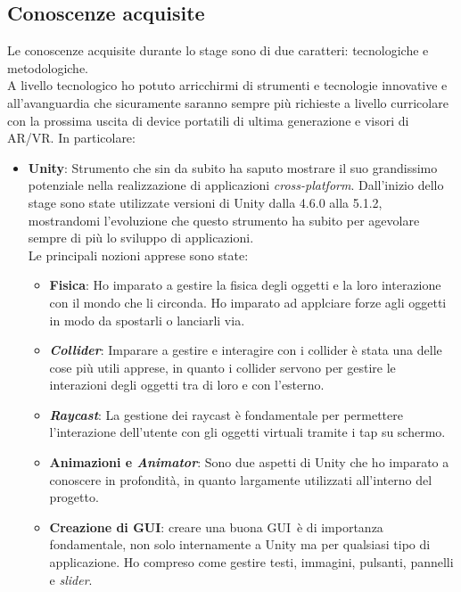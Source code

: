 \subsection{Conoscenze acquisite}
Le conoscenze acquisite durante lo stage sono di due caratteri: tecnologiche e metodologiche. \\
A livello tecnologico ho potuto arricchirmi di strumenti e tecnologie innovative e all'avanguardia che sicuramente saranno sempre pi\`u richieste a livello curricolare con la prossima uscita di device portatili di ultima generazione e visori di AR/VR. In particolare:

\begin{itemize}
	\item \textbf{Unity}: Strumento che sin da subito ha saputo mostrare il suo grandissimo potenziale nella realizzazione di applicazioni \textit{cross-platform\gloss}. Dall'inizio dello stage sono state utilizzate versioni di Unity dalla 4.6.0 alla 5.1.2, mostrandomi l'evoluzione che questo strumento ha subito per agevolare sempre di pi\`u lo sviluppo di applicazioni.\\
	Le principali nozioni apprese sono state:
	\begin{itemize}
		\item \textbf{Fisica}: Ho imparato a gestire la fisica degli oggetti e la loro interazione con il mondo che li circonda. Ho imparato ad applciare forze agli oggetti in modo da spostarli o lanciarli via.
		
		\item \textbf{\textit{Collider\gloss}}: Imparare a gestire e interagire con i collider \`e stata una delle cose pi\`u utili apprese, in quanto i collider servono per gestire le interazioni degli oggetti tra di loro e con l'esterno.
		
		\item \textbf{\textit{Raycast}}: La gestione dei raycast \`e fondamentale per permettere l'interazione dell'utente con gli oggetti virtuali tramite i tap su schermo.
		
		\item \textbf{Animazioni e \textit{Animator}}: Sono due aspetti di Unity che ho imparato a conoscere in profondit\`a, in quanto largamente utilizzati all'interno del progetto.
		
		\item \textbf{Creazione di GUI\gloss}: creare una buona GUI\gloss\ \`e di importanza fondamentale, non solo internamente a Unity ma per qualsiasi tipo di applicazione. Ho compreso come gestire testi, immagini, pulsanti, pannelli e \textit{slider}.
	\end{itemize}
	

\end{itemize}
